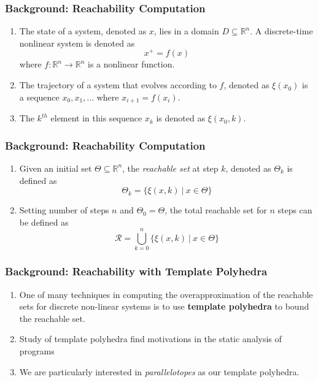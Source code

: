 \documentclass{beamer}
\begin{document}
\begin{frame}
  \frametitle{\textbf{Background:} Reachability Computation}
  \begin{enumerate}
    \item The state of a system, denoted as $x$, lies in a domain $D \subseteq \mathbb{R}^n$.
    A discrete-time nonlinear system is denoted as
    \begin{equation}
      x^{+} = f(x)
    \end{equation}
    where $f: \mathbb{R}^{n} \rightarrow \mathbb{R}^{n}$ is a nonlinear function.
    \item The trajectory of a system that evolves according to $f$, denoted as $\xi(x_0)$ is a sequence $x_0, x_1, \ldots $ where $x_{i+1} = f(x_i)$.
    \item The $k^{th}$ element in this sequence $x_k$ is denoted as $\xi(x_0,k)$.
  \end{enumerate}
\end{frame}

\begin{frame}
  \frametitle{\textbf{Background:} Reachability Computation}
  \begin{enumerate}
  \item Given an initial set $\Theta \subseteq \mathbb{R}^n$, the \emph{reachable set} at step $k$, denoted as $\Theta_k$ is defined as
  \begin{equation*}
    \Theta_k = \{ \xi(x,k)\: | \: x \in \Theta\}
  \end{equation*}
  \item Setting number of steps $n$ and $\Theta_0 = \Theta$, the total reachable set for $n$ steps can be defined as
  \begin{equation*}
    \mathcal{R} = \bigcup_{k=0}^n \{ \xi(x,k)\: | \: x \in \Theta\}
  \end{equation*}
  \end{enumerate}
\end{frame}

\begin{frame}
  \frametitle{\textbf{Background:} Reachability with Template Polyhedra}
  \begin{enumerate}
  \item One of many techniques in computing the overapproximation of the reachable sets for discrete non-linear systems is to use \textbf{template polyhedra} to bound the reachable set.
  \item Study of template polyhedra find motivations in the static analysis of programs
  \item We are particularly interested in \emph{parallelotopes} as our template polyhedra.
\end{enumerate}
\end{frame}
\end{document}
